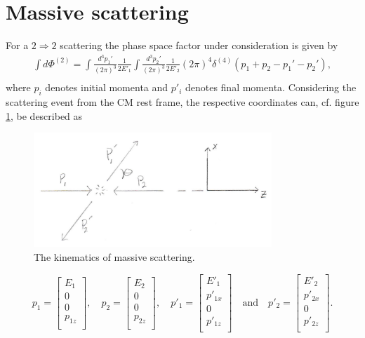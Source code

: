 \section{Massive scattering}
For a $2\Rightarrow 2$ scattering the phase space factor under consideration is given by
\begin{equation}
	\begin{split}
		\int d\Phi^{(2)}=\int\frac{d^3p_1'}{(2\pi)^3}\frac{1}{2E'_{1}}\int\frac{d^3p_2'}{(2\pi)^3}\frac{1}{2E'_{2}}(2\pi)^4\delta^{(4)}(p_1+p_2-p_1'-p_2'),\\
	\end{split}
	\label{kin1}
\end{equation} 
where $p_i$ denotes initial momenta and $p'_i$ denotes final momenta. Considering the scattering event from the CM rest frame, the respective coordinates can, cf. figure \ref{fig:shi}, be described as
\begin{figure}[H]
	\captionsetup{width=1\textwidth}
	\centering
	\includegraphics[width=0.8\textwidth]{figures/scat3}
	\caption{The kinematics of massive scattering.}
	\label{fig:shi}
\end{figure}
\begin{equation}
	p_1=\begin{bmatrix}
		E_1 \\ 0\\ 0 \\ p_{1z} \\
	\end{bmatrix} ,\quad
	p_2=\begin{bmatrix}
		E_2 \\ 0\\ 0\\ p_{2z}\\
	\end{bmatrix},\quad 
	p'_1=\begin{bmatrix}
		E'_1 \\ p'_{1x}\\ 0 \\ p'_{1z} \\
	\end{bmatrix} \quad \text{and}\quad
	p'_2=\begin{bmatrix}
		E'_2 \\ p'_{2x}\\ 0\\ p'_{2z}\\
	\end{bmatrix}.
\end{equation} 

